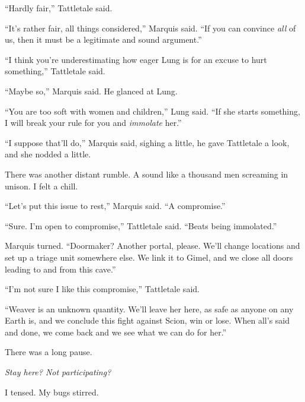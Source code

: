 ``Hardly fair,'' Tattletale said.



``It's rather fair, all things considered,'' Marquis said.  ``If you can convince \emph{all} of us, then it must be a legitimate and sound argument.''



``I think you're underestimating how eager Lung is for an excuse to hurt something,'' Tattletale said.



``Maybe so,'' Marquis said.  He glanced at Lung.



``You are too soft with women and children,'' Lung said.  ``If she starts something, I will break your rule for you and \emph{immolate} her.''



``I suppose that'll do,'' Marquis said, sighing a little, he gave Tattletale a look, and she nodded a little.



There was another distant rumble.  A sound like a thousand men screaming in unison.  I felt a chill.



``Let's put this issue to rest,'' Marquis said.  ``A compromise.''



``Sure.  I'm open to compromise,'' Tattletale said.  ``Beats being immolated.''



Marquis turned.  ``Doormaker?  Another portal, please.  We'll change locations and set up a triage unit somewhere else.  We link it to Gimel, and we close all doors leading to and from this cave.''



``I'm not sure I like this compromise,'' Tattletale said.



``Weaver is an unknown quantity.  We'll leave her here, as safe as anyone on any Earth is, and we conclude this fight against Scion, win or lose.  When all's said and done, we come back and we see what we can do for her.''



There was a long pause.



\emph{Stay here?  Not participating?}



I tensed.  My bugs stirred.



